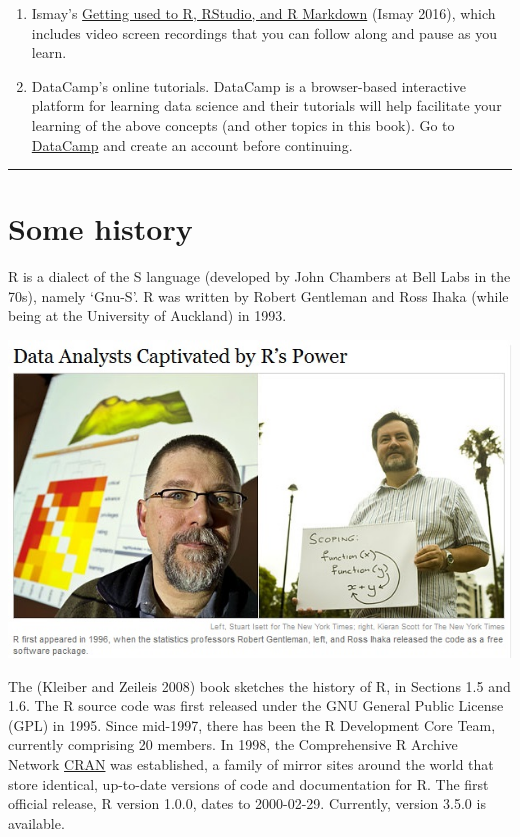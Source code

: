 \documentclass[
]{book}
\providecommand{\tightlist}{%
  \setlength{\itemsep}{0pt}\setlength{\parskip}{0pt}}
\begin{document}
\begin{enumerate}
\def\labelenumi{\arabic{enumi}.}
\tightlist
\item
  Ismay's \href{http://ismayc.github.io/rbasics-book}{Getting used to R, RStudio, and R Markdown} (Ismay 2016), which includes video screen recordings that you can follow along and pause as you learn.
\item
  DataCamp's online tutorials. DataCamp is a browser-based interactive platform for learning data science and their tutorials will help facilitate your learning of the above concepts (and other topics in this book). Go to \href{https://www.datacamp.com/}{DataCamp} and create an account before continuing.
\end{enumerate}

\begin{center}\rule{0.5\linewidth}{0.5pt}\end{center}

\hypertarget{some-history}{%
\section{Some history}\label{some-history}}

R is a dialect of the S language (developed by John Chambers at Bell Labs in the 70s), namely `Gnu-S'. R was written by Robert Gentleman and Ross Ihaka (while being at the University of Auckland) in 1993.

\begin{center}\includegraphics[width=8.54in]{images/NYTimesR2009} \end{center}

The (Kleiber and Zeileis 2008) book sketches the history of R, in Sections 1.5 and 1.6. The R source code was first released under the GNU General Public License (GPL) in 1995. Since mid-1997, there has been the R Development Core Team, currently comprising 20 members. In 1998, the Comprehensive R Archive Network \href{http://CRAN.R-project.org/}{CRAN} was established, a family of mirror sites around the world that store identical, up-to-date versions of code and documentation for R. The first official release, R version 1.0.0, dates to 2000-02-29. Currently, version 3.5.0 is available.
\end{document}
